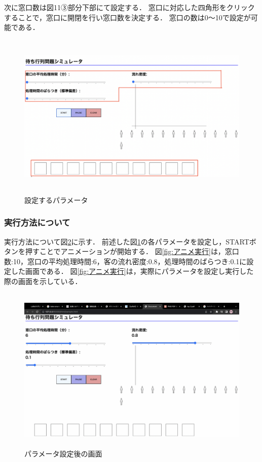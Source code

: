 \documentclass[12pt,a4j]{ltjsarticle}
\begin{document}
次に窓口数は図11③部分下部にて設定する．
窓口に対応した四角形をクリックすることで，窓口に開閉を行い窓口数を決定する．
窓口の数は0〜10で設定が可能である．
\begin{figure}[h]
\begin{center}
\includegraphics[height = 80mm ] {figures/lay2.pdf}
\caption{設定するパラメータ}
\label{fig:layout_ex}
\end{center}
\end{figure}

\clearpage

\subsubsection{実行方法について}
実行方法について図\ref{fig:設定}に示す．
前述した図\ref{fig:layout_ex}の各パラメータを設定し，STARTボタンを押すことでアニメーションが開始する．
図\ref{fig:アニメ実行}は，窓口数:10，窓口の平均処理時間:6，客の流れ密度:0.8，処理時間のばらつき:0.1に設定した画面である．
図\ref{fig:アニメ実行}は，実際にパラメータを設定し実行した際の画面を示している．
\begin{figure}[h]
\begin{center}
\includegraphics[height = 80mm ] {figures/lay_para.pdf}
\caption{パラメータ設定後の画面}
\label{fig:設定}
\end{center}
\end{figure}
\end{document}
